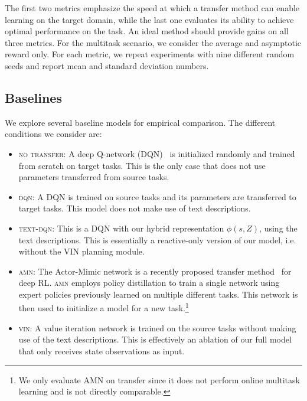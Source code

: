 The first two metrics emphasize the speed at which a transfer method can enable learning on the target domain, while the last one evaluates its ability to achieve optimal performance on the task. An ideal method should provide gains on all three metrics.
For the multitask scenario, we consider the average and asymptotic reward only.  For each metric, we repeat experiments with nine different random seeds and report mean and standard deviation numbers.

\subsection{Baselines}
We explore several baseline models for empirical comparison. The different conditions we consider are:
\begin{itemize}[leftmargin=0.45cm]
\itemsep0em 
\item \textsc{no transfer}: A deep Q-network (DQN)~\cite{mnih2015dqn} is initialized randomly and trained from scratch on target tasks. This is the only case that does not use parameters transferred from source tasks.
\item \textsc{dqn}: A DQN is trained on source tasks and its parameters are transferred to target tasks. This model does not make use of text descriptions.
\item \textsc{text-dqn}: This is a DQN with our hybrid representation $\phi(s, Z)$, using the text descriptions. This is essentially a reactive-only version of our model, i.e. without the VIN planning module.
\item \textsc{amn}: The Actor-Mimic network is a recently proposed transfer method~\cite{parisotto2016actor} for deep RL. \textsc{amn} employs policy distillation to train a single network using expert policies previously learned on multiple different tasks. This network is then used to initialize a model for a new task.\footnote{We only evaluate AMN on transfer since it does not perform online multitask learning and is not directly comparable.}
\item \textsc{vin}: A value iteration network is trained on the source tasks without making use of the text descriptions. This is effectively an ablation of our full model that only receives state observations as input.
\end{itemize}

